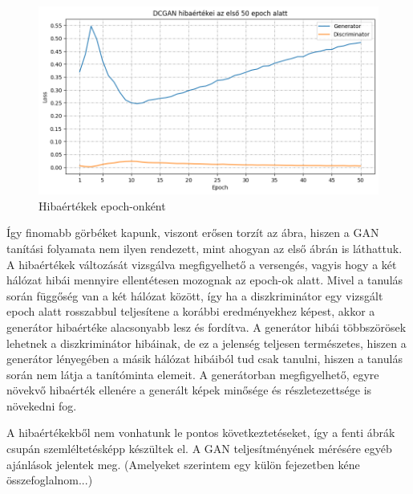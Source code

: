 \begin{figure}[h]
\centering
\includegraphics[width=15cm]{images/epochloss.png}
\caption{Hibaértékek epoch-onként}
\label{fig:epoch_loss_plot}
\end{figure}

Így finomabb görbéket kapunk, viszont erősen torzít az ábra, hiszen a GAN tanítási folyamata nem ilyen rendezett, mint ahogyan az első ábrán is láthattuk.
A hibaértékek változását vizsgálva megfigyelhető a versengés, vagyis hogy a két hálózat hibái mennyire ellentétesen mozognak az epoch-ok alatt. Mivel a tanulás során függőség van a két hálózat között, így ha a diszkriminátor egy vizsgált epoch alatt rosszabbul teljesítene a korábbi eredményekhez képest, akkor a generátor hibaértéke alacsonyabb lesz és fordítva. A generátor hibái többszörösek lehetnek a diszkriminátor hibáinak, de ez a jelenség teljesen természetes, hiszen a generátor lényegében a másik hálózat hibáiból tud csak tanulni, hiszen a tanulás során nem látja a tanítóminta elemeit. A generátorban megfigyelhető, egyre növekvő hibaérték ellenére a generált képek minősége és részletezettsége is növekedni fog.

A hibaértékekből nem vonhatunk le pontos következtetéseket, így a fenti ábrák csupán szemléltetésképp készültek el. A GAN teljesítményének mérésére egyéb ajánlások jelentek meg. (Amelyeket szerintem egy külön fejezetben kéne összefoglalnom...)


